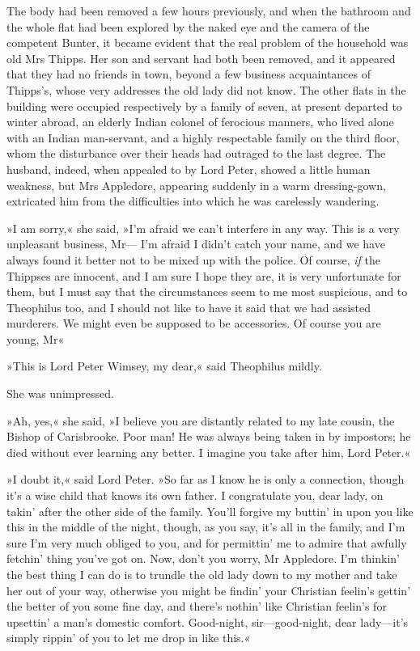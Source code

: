 The body had been removed a few hours previously, and when the bathroom and the whole flat had been explored by the naked eye and the camera of the competent Bunter, it became evident that the real problem of the household was old Mrs Thipps. Her son and servant had both been removed, and it appeared that they had no friends in town, beyond a few business acquaintances of Thipps's, whose very addresses the old lady did not know. The other flats in the building were occupied respectively by a family of seven, at present departed to winter abroad, an elderly Indian colonel of ferocious manners, who lived alone with an Indian man-servant, and a highly respectable family on the third floor, whom the disturbance over their heads had outraged to the last degree. The husband, indeed, when appealed to by Lord Peter, showed a little human weakness, but Mrs Appledore, appearing suddenly in a warm dressing-gown, extricated him from the difficulties into which he was carelessly wandering.

»I am sorry,« she said, »I'm afraid we can't interfere in any way. This is a very unpleasant business, Mr--- I'm afraid I didn't catch your name, and we have always found it better not to be mixed up with the police. Of course, \textit{if} the Thippses are innocent, and I am sure I hope they are, it is very unfortunate for them, but I must say that the circumstances seem to me most suspicious, and to Theophilus too, and I should not like to have it said that we had assisted murderers. We might even be supposed to be accessories. Of course you are young, Mr\longdash«

»This is Lord Peter Wimsey, my dear,« said Theophilus mildly.

She was unimpressed.

»Ah, yes,« she said, »I believe you are distantly related to my late cousin, the Bishop of Carisbrooke. Poor man! He was always being taken in by impostors; he died without ever learning any better. I imagine you take after him, Lord Peter.«

»I doubt it,« said Lord Peter. »So far as I know he is only a connection, though it's a wise child that knows its own father. I congratulate you, dear lady, on takin' after the other side of the family. You'll forgive my buttin' in upon you like this in the middle of the night, though, as you say, it's all in the family, and I'm sure I'm very much obliged to you, and for permittin' me to admire that awfully fetchin' thing you've got on. Now, don't you worry, Mr Appledore. I'm thinkin' the best thing I can do is to trundle the old lady down to my mother and take her out of your way, otherwise you might be findin' your Christian feelin's gettin' the better of you some fine day, and there's nothin' like Christian feelin's for upsettin' a man's domestic comfort. Good-night, sir—good-night, dear lady—it's simply rippin' of you to let me drop in like this.«

